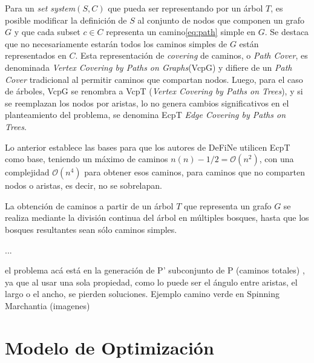 Para un {\it set system}$(S,C)$ que pueda ser representando por un \'arbol $T$, es posible modificar la definici\'on de $S$ al conjunto de nodos que componen un grafo $G$ y que cada subset $c \in C$ representa un camino\eqref{eq:path} simple en $G$. Se destaca que no necesariamente estar\'an todos los caminos simples de $G$ est\'an representados en $C$. Esta representaci\'on de {\it covering} de caminos, o {\it Path Cover}, es denominada {\it Vertex Covering by Paths on Graphs}(VcpG) y difiere de un {\it Path Cover} tradicional al permitir caminos que compartan nodos. Luego, para el caso de \'arboles, VcpG se renombra a VcpT ({\it Vertex Covering by Paths on Trees}), y si se reemplazan los nodos por aristas, lo no genera cambios significativos en el planteamiento del problema, se denomina EcpT {\it Edge Covering by Paths on Trees}. %


Lo anterior establece las bases para que los autores de DeFiNe\cite{breuer2015define} utilicen EcpT como base, teniendo un m\'aximo de caminos $n(n)-1/2 = \mathcal{O}(n^{2})$, con una complejidad $\mathcal{O}(n^{4})$ para obtener esos caminos, para caminos que no comparten nodos o aristas, es decir, no se sobrelapan.

La obtenci\'on de caminos a partir de un \'arbol $T$ que representa un grafo $G$ se realiza mediante la divisi\'on continua del \'arbol en m\'ultiples bosques, hasta que los bosques resultantes sean s\'olo caminos simples.

...


el problema acá está en la generación de P' subconjunto de P (caminos totales) , ya que al usar una sola propiedad, como lo puede ser el ángulo entre aristas, el largo o el ancho, se pierden soluciones. Ejemplo camino verde en Spinning Marchantia (imagenes)





\section{Modelo de Optimización}

